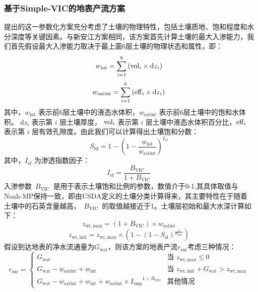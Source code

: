\subsubsection{基于Simple-VIC的地表产流方案}
\cite{Liang2003Anew}提出的这一参数化方案充分考虑了土壤的物理特性，包括土壤质地、饱和程度和水分深度等关键因素。与新安江方案相同，该方案首先计算土壤的最大入渗能力，我们首先假设最大入渗能力取决于最上面6层土壤的物理状态和属性，即：
\begin{equation}
w_{\mathrm{{int}}} = \sum_{i=1}^{6}\left( {\rm vol}_{i} \times {{\mathrm {d}} z}_{i} \right)
\end{equation}
\begin{equation}
w_{\mathrm{{satint}}} = \sum_{i=1}^{6}\left( {\rm eff}_{i} \times {{\mathrm {d}} z}_{i} \right)
\end{equation}
其中，$w_{\mathrm{{int}}}$ 表示前6层土壤中的液态水体积，$w_{\mathrm{{satint}}}$ 表示前6层土壤中的饱和水体积。 ${{\mathrm {d}} z}_{i}$ 表示第 $i$ 层土壤厚度， ${\rm vol}_{i}$ 表示第 $i$ 层土壤中液态水体积百分比，${\rm eff}_{i}$ 表示第 $i$ 层有效孔隙度。由此我们可以计算得出土壤饱和分数：
\begin{equation}
{S}_{\mathrm{{Sf}}} = 1 - \left( 1 - \frac{w_{\mathrm{{int}}}}{w_{\mathrm{{satint}}}} \right)^{{I}_{\mathrm{{ef}}}}
\end{equation}
其中，${I}_{\mathrm{{ef}}}$ 为渗透指数因子：
\begin{equation}
{I}_{\mathrm{{ef}}} = \frac{B_{\mathrm{{VIC}}}}{1 + B_{\text{VIC}}}
\end{equation}
入渗参数~$B_{\mathrm{{VIC}}}$~是用于表示土壤饱和比例的参数，数值介于0-1,其具体取值与Noah-MP保持一致，即由USDA定义的土壤分类计算得来，其主要特性在于随着土壤中的石英含量越高，~$B_{\mathrm{VIC}}$~的取值越接近于1。土壤层初始和最大水深计算如下：
\begin{equation}
z_{\mathrm{wt,max}}= \left( 1 + B_{\mathrm{{VIC}}} \right) \times w_{\mathrm{{satint}}}
\end{equation}
\begin{equation}
z_{\mathrm{wt,init}} = z_{\mathrm{wt,max}} \times \left( 1 - \left( 1 - {S}_{\mathrm{{sf}}} \right)^{\frac{1}{B_{\mathrm{{VIC}}}}} \right)
\end{equation}
假设到达地表的净水流通量为$G_{\mathrm{wat}}$，则该方案的地表产流$r_{\mathrm{sur}}$考虑三种情况：
\begin{equation}
r_{\mathrm{sur}} = 
\begin{cases}
G_{\mathrm{wat}} & \text{当 } z_{\mathrm{wt,max}} \leq 0 \\
G_{\mathrm{wat}} - w_{\mathrm{{satint}}} + w_{\mathrm{{int}}} & \text{当 } z_{\mathrm{wt,init}} + G_{\mathrm{wat}} > z_{\mathrm{wt,max}} \\
G_{\mathrm{wat}}- w_{\mathrm{{satint}}} + w_{\mathrm{{int}}} + w_{\mathrm{{satint}}} \times {{I}_{\mathrm{{tmp}}}}^{1 + B_{\mathrm{{VIC}}}} & \text{其他情况}
\end{cases}
\end{equation}

